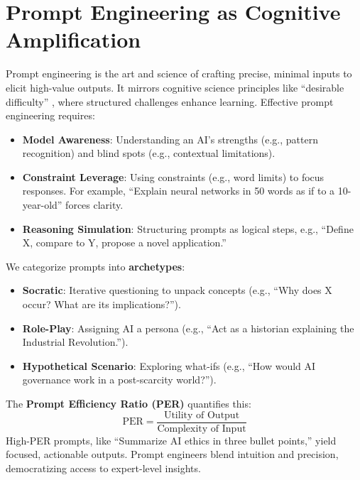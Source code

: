 \documentclass{article}
\begin{document}
\section{Prompt Engineering as Cognitive Amplification}
Prompt engineering is the art and science of crafting precise, minimal inputs to elicit high-value outputs. It mirrors cognitive science principles like ``desirable difficulty'' \cite{bjork1994}, where structured challenges enhance learning. Effective prompt engineering requires:
\begin{itemize}
    \item \textbf{Model Awareness}: Understanding an AI’s strengths (e.g., pattern recognition) and blind spots (e.g., contextual limitations).
    \item \textbf{Constraint Leverage}: Using constraints (e.g., word limits) to focus responses. For example, ``Explain neural networks in 50 words as if to a 10-year-old'' forces clarity.
    \item \textbf{Reasoning Simulation}: Structuring prompts as logical steps, e.g., ``Define X, compare to Y, propose a novel application.''
\end{itemize}

We categorize prompts into \textbf{archetypes}:
\begin{itemize}
    \item \textbf{Socratic}: Iterative questioning to unpack concepts (e.g., ``Why does X occur? What are its implications?'').
    \item \textbf{Role-Play}: Assigning AI a persona (e.g., ``Act as a historian explaining the Industrial Revolution.'').
    \item \textbf{Hypothetical Scenario}: Exploring what-ifs (e.g., ``How would AI governance work in a post-scarcity world?'').
\end{itemize}

The \textbf{Prompt Efficiency Ratio (PER)} quantifies this:
\[ \text{PER} = \frac{\text{Utility of Output}}{\text{Complexity of Input}} \]
High-PER prompts, like ``Summarize AI ethics in three bullet points,'' yield focused, actionable outputs. Prompt engineers blend intuition and precision, democratizing access to expert-level insights.
\end{document}
